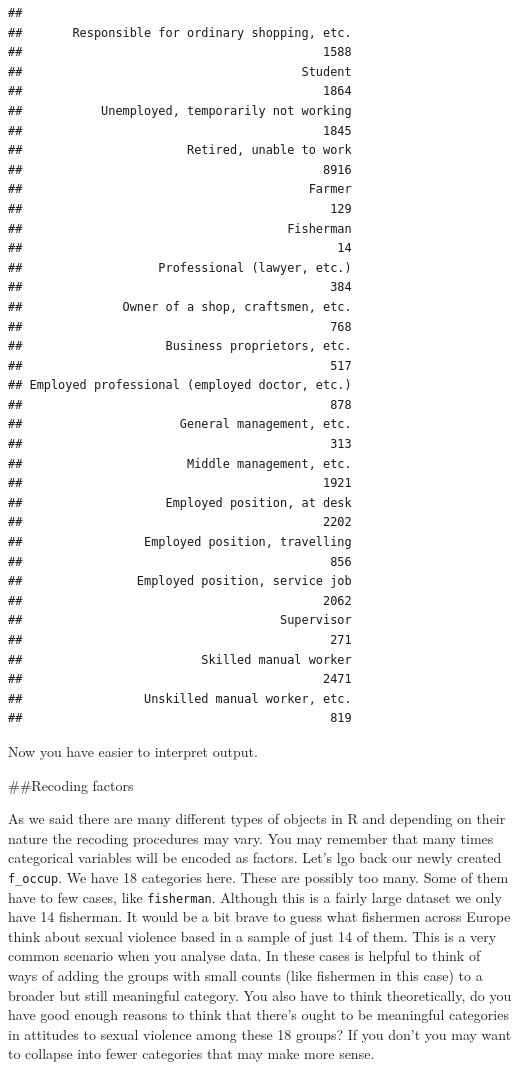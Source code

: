 \documentclass[]{book}
\theoremstyle{definition}
\theoremstyle{definition}
\theoremstyle{definition}
\theoremstyle{remark}
\begin{document}
\begin{verbatim}
## 
##       Responsible for ordinary shopping, etc. 
##                                          1588 
##                                       Student 
##                                          1864 
##           Unemployed, temporarily not working 
##                                          1845 
##                       Retired, unable to work 
##                                          8916 
##                                        Farmer 
##                                           129 
##                                     Fisherman 
##                                            14 
##                   Professional (lawyer, etc.) 
##                                           384 
##              Owner of a shop, craftsmen, etc. 
##                                           768 
##                    Business proprietors, etc. 
##                                           517 
## Employed professional (employed doctor, etc.) 
##                                           878 
##                      General management, etc. 
##                                           313 
##                       Middle management, etc. 
##                                          1921 
##                    Employed position, at desk 
##                                          2202 
##                 Employed position, travelling 
##                                           856 
##                Employed position, service job 
##                                          2062 
##                                    Supervisor 
##                                           271 
##                         Skilled manual worker 
##                                          2471 
##                 Unskilled manual worker, etc. 
##                                           819
\end{verbatim}

Now you have easier to interpret output.

\#\#Recoding factors

As we said there are many different types of objects in R and depending
on their nature the recoding procedures may vary. You may remember that
many times categorical variables will be encoded as factors. Let's lgo
back our newly created \texttt{f\_occup}. We have 18 categories here.
These are possibly too many. Some of them have to few cases, like
\texttt{fisherman}. Although this is a fairly large dataset we only have
14 fisherman. It would be a bit brave to guess what fishermen across
Europe think about sexual violence based in a sample of just 14 of them.
This is a very common scenario when you analyse data. In these cases is
helpful to think of ways of adding the groups with small counts (like
fishermen in this case) to a broader but still meaningful category. You
also have to think theoretically, do you have good enough reasons to
think that there's ought to be meaningful categories in attitudes to
sexual violence among these 18 groups? If you don't you may want to
collapse into fewer categories that may make more sense.
\end{document}
